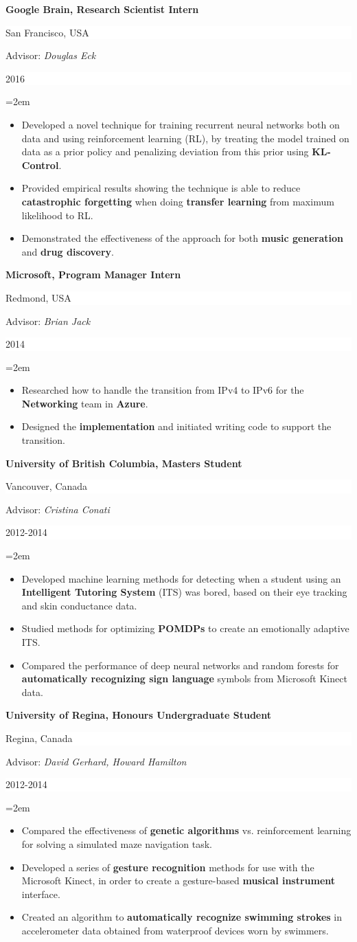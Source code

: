 \documentclass[paper=letter,fontsize=11pt]{scrartcl} %
\newcommand{\sepspace}{\vspace*{1em}}        %
\newcommand{\ResearchEntry}[5]{
        \noindent \textbf{#1} \hfill      %
        \colorbox{White}{%
            \parbox{10em}{%
            \hfill\color{Black}#2}} \par  %
        \noindent Advisor: \textit{#3} \hfill      %
        \colorbox{White}{%
            \parbox{6em}{%
            \hfill\color{Black}#4}} \par  %
        \noindent\hangindent=2em\hangafter=0 \small #5 %
        \normalsize \par}
\begin{document}
\ResearchEntry{Google Brain, Research Scientist Intern}{San Francisco, USA}{Douglas Eck}{2016}
{\begin{itemize}
    \item Developed a novel technique for training recurrent neural networks both on data and using reinforcement learning (RL), by treating the model trained on data as a prior policy and penalizing deviation from this prior using \textbf{KL-Control}.
    \item Provided empirical results showing the technique is able to reduce \textbf{catastrophic forgetting} when doing \textbf{transfer learning} from maximum likelihood to RL. 
    \item Demonstrated the effectiveness of the approach for both \textbf{music generation} and \textbf{drug discovery}.
\end{itemize}}
\sepspace

\ResearchEntry{Microsoft, Program Manager Intern}{Redmond, USA}{Brian Jack}{2014}
{\begin{itemize}
    \item Researched how to handle the transition from IPv4 to IPv6 for the \textbf{Networking} team in \textbf{Azure}.
    \item Designed the \textbf{implementation} and initiated writing code to support the transition.
\end{itemize}}
\sepspace

\ResearchEntry{University of British Columbia, Masters Student}{Vancouver, Canada}{Cristina Conati}{2012-2014}
{\begin{itemize}
    \item Developed machine learning methods for detecting when a student using an \textbf{Intelligent Tutoring System} (ITS) was bored, based on their eye tracking and skin conductance data.
    \item Studied methods for optimizing \textbf{POMDPs} to create an emotionally adaptive ITS. 
    \item Compared the performance of deep neural networks and random forests for \textbf{automatically recognizing sign language} symbols from Microsoft Kinect data. 
\end{itemize}}
\sepspace

\ResearchEntry{University of Regina, Honours Undergraduate Student}{Regina, Canada}{David Gerhard, Howard Hamilton}{2012-2014}
{\begin{itemize}
    \item Compared the effectiveness of \textbf{genetic algorithms} vs. reinforcement learning for solving a simulated maze navigation task. 
    \item Developed a series of \textbf{gesture recognition} methods for use with the Microsoft Kinect, in order to create a gesture-based \textbf{musical instrument} interface.
    \item Created an algorithm to \textbf{automatically recognize swimming strokes} in accelerometer data obtained from waterproof devices worn by swimmers.
\end{itemize}}
\sepspace
\end{document}

